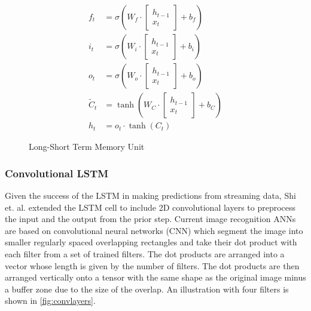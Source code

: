 \documentclass{article}
\begin{document}
\begin{align}
    f_t &= \sigma\left(W_f\cdot\left[\begin{array}{c}h_{t-1}\\x_t \end{array}\right]+b_f\right)\label{eqn:sigmaf}\\
    i_t &= \sigma\left(W_i\cdot\left[\begin{array}{c}h_{t-1}\\x_t \end{array}\right]+b_i\right)\label{eqn:sigmai}\\
    o_t &= \sigma\left(W_o\cdot\left[\begin{array}{c}h_{t-1}\\x_t \end{array}\right]+b_o\right)\label{eqn:sigmao}\\
    \tilde{C}_t &= \tanh\left(W_C\cdot\left[\begin{array}{c}h_{t-1}\\x_t \end{array}\right]+b_C\right)\label{eqn:tanhCt}\\
    h_t &= o_t\cdot\tanh\left(C_t\right)\label{eqn:tanhC}
\end{align}

\begin{figure}
    
    \caption{Long-Short Term Memory Unit}
    \label{fig:lstm}
\end{figure}

\subsubsection{Convolutional LSTM}
Given the success of the LSTM in making predictions from streaming data, Shi et. al. extended the LSTM cell to include 2D convolutional layers to preprocess the input and the output from the prior step.  Current image recognition ANNs are based on convolutional neural networks (CNN) which segment the image into smaller regularly spaced overlapping rectangles and take their dot product with each filter from a set of trained filters. The dot products are arranged into a vector whose length is given by the number of filters.  The dot products are then arranged vertically onto a tensor with the same shape as the original image minus a buffer zone due to the size of the overlap.  An illustration with four filters is shown in \cref{fig:convlayers}.  
\end{document}
